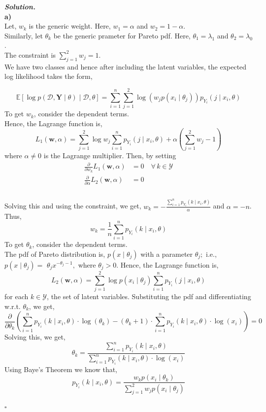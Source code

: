 \documentclass[12pt]{article}
\newenvironment{solution}[1][\it{Solution}]{\textbf{#1. } }{$\square$}
\begin{document}
\begin{solution}
\\
\textbf{a)}
\\
Let, $w_k$ is the generic weight. Here, $w_1 = \alpha$ and $w_2 = 1 - \alpha$.\\
Similarly, let $\theta_k$ be the generic prameter for Pareto pdf. Here, $\theta_1 = \lambda_1$ and $\theta_2 = \lambda_0$.\\
The constraint is $\sum_{j=1}^{2}w_j = 1$.\\
We have two classes and hence after including the latent variables, the expected log likelihood takes the form,

$$
\mathbb{E}\left[\log p(\mathcal{D}, \boldsymbol{Y} \mid \theta) \mid \mathcal{D}, \theta\right]=\sum_{i=1}^{n} \sum_{j=1}^{2} \log \left(w_{j} p\left(x_{i} \mid \theta_{j}\right)\right) p_{Y_{i}}\left(j \mid x_{i}, \theta\right)
$$
To get $w_k$, consider the dependent terms.\\
Hence, the Lagrange function is,
$$
L_1(\boldsymbol{w}, \alpha) = \sum_{j=1}^{2} \log w_{j} \sum_{i=1}^{n} p_{Y_{i}}\left(j \mid x_{i}, \theta\right)+\alpha\left(\sum_{j=1}^{2} w_{j}-1\right)
$$
where $\alpha \neq 0$ is the Lagrange multiplier.
Then, by setting
$$
\begin{aligned}
\frac{\partial}{\partial w_{k}} L_1(\boldsymbol{w}, \alpha) &=0 \quad \forall \,k \in \mathcal{Y} \\
\frac{\partial}{\partial \alpha} L_2(\boldsymbol{w}, \alpha) &=0\\
\end{aligned}
$$
\\
Solving this and using the constraint, we get, $w_{k}=-\frac{\sum_{i=1}^{n} p_{Y_{i}}\left(k \mid x_{i}, \theta\right)}{\alpha}$ and $\alpha=-n$. Thus,
$$
\boxed{w_{k}=\frac{1}{n} \sum_{i=1}^{n} p_{Y_{i}}\left(k \mid x_{i}, \theta\right)}
$$
To get $\theta_k$, consider the dependent terms.\\
The pdf of Pareto distribution is, $p\left(x \mid \theta_{j}\right)$ with a parameter $\theta_{j};$ i.e., $p\left(x \mid \theta_{j}\right)=$ $\theta_{j} x^{-\theta_{j} - 1},$ where $\theta_{j}>0$. Hence, the Lagrange function is,
$$
L_2(\boldsymbol{w}, \alpha) = \sum_{j=1}^{2} \log p\left(x_{i} \mid \theta_{j}\right) \sum_{i=1}^{n} p_{Y_{i}}\left(j \mid x_{i}, \theta\right)
$$
for each $k \in \mathcal{Y}$, the set of latent variables. Substituting the pdf and differentiating w.r.t. $\theta_k$, we get,
$$
\frac{\partial}{\partial \theta_k}\left(\sum_{i=1}^{n} p_{Y_{i}}\left(k \mid x_{i}, \theta\right) \cdot\log(\theta_k)-(\theta_k+1)\cdot\sum_{i=1}^{n}p_{Y_{i}}\left(k \mid x_{i}, \theta\right) \cdot \log(x_i)\right)=0
$$
Solving this, we get,
$$
\boxed{\theta_{k}=\frac{\sum_{i=1}^{n}p_{Y_{i}}\left(k \mid x_{i}, \theta\right)}{\sum_{i=1}^{n} p_{Y_{i}}\left(k \mid x_{i}, \theta\right) \cdot \log(x_{i})}}
$$
Using Baye's Theorem we know that,
$$
p_{Y_{i}}\left(k \mid x_{i}, \theta\right)=\frac{w_{k} p\left(x_{i} \mid \theta_{k}\right)}{\sum_{j=1}^{2} w_{j} p\left(x_{i} \mid \theta_{j}\right)}
$$




\end{solution}
\end{document}
